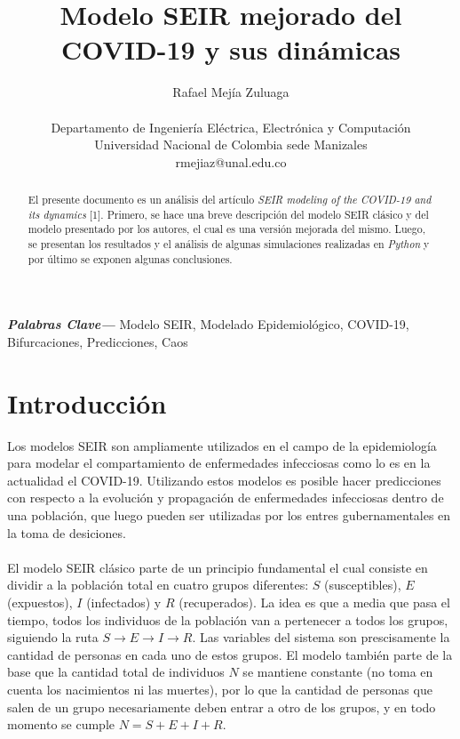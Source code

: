 \documentclass[conference]{IEEEtran}
\providecommand{\keywords}[1]
{
  \small	
  \textbf{\textit{Palabras Clave---}} #1
}
\begin{document}
    

\title{Modelo SEIR mejorado del COVID-19 y sus dinámicas}

\author{Rafael Mejía Zuluaga \\\\Departamento de Ingeniería Eléctrica, Electrónica y Computación \\ Universidad Nacional de Colombia sede Manizales \\ rmejiaz@unal.edu.co}

\maketitle


\begin{abstract}
    El presente documento es un análisis del artículo \textit{SEIR modeling of the
    COVID-19 and its dynamics} [1]. Primero, se hace una breve descripción del modelo SEIR 
    clásico y del modelo presentado por los autores, el cual es una versión mejorada del mismo.
    Luego, se presentan los resultados y el análisis de algunas simulaciones realizadas en 
    \textit{Python} y por último se exponen algunas conclusiones.  
    \newline
\end{abstract}

\keywords{Modelo SEIR, Modelado Epidemiológico, COVID-19, Bifurcaciones, Predicciones, Caos}

\section{Introducción}
Los modelos SEIR son ampliamente utilizados en el campo de la epidemiología para 
modelar el compartamiento de enfermedades infecciosas como lo es en la actualidad 
el COVID-19. Utilizando estos modelos es posible hacer predicciones con respecto 
a la evolución y propagación de enfermedades infecciosas dentro de una población, que 
luego pueden ser utilizadas por los entres gubernamentales en la toma de desiciones.
\\\\
El modelo SEIR clásico parte de un principio fundamental el cual consiste en dividir a
la población total en cuatro grupos diferentes: $S$ (susceptibles), $E$ (expuestos),
$I$ (infectados) y $R$ (recuperados). La idea es que a media que pasa el tiempo, 
todos los individuos de la población van a pertenecer a todos los grupos, siguiendo la 
ruta $S \rightarrow E \rightarrow I \rightarrow R$. Las variables del sistema son
prescisamente la cantidad de personas en cada uno de estos grupos. El modelo también 
parte de la base que la cantidad total de individuos $N$ se mantiene constante (no toma en
cuenta los nacimientos ni las muertes), por lo que la cantidad de personas que salen de
un grupo necesariamente deben entrar a otro de los grupos, y en todo momento se cumple
$N = S + E + I + R$.
\end{document}
